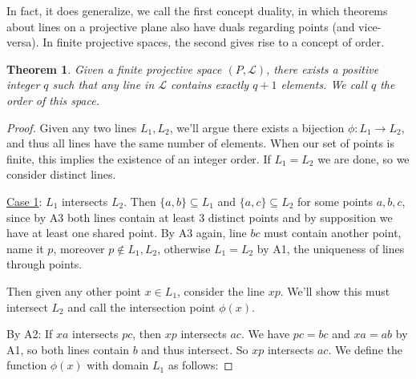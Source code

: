 \documentclass[12pt]{article}
\newtheorem{theorem}{Theorem}
\begin{document}
    In fact, it does generalize, we call the first concept duality,
    in which theorems about lines on a projective plane also have duals regarding points (and vice-versa).
    In finite projective spaces, the second gives rise to a concept of order\cite[p. 24]{beutelspacher_projective_1998}.

    \begin{theorem}
        Given a finite projective space $(P, \mathcal{L})$, there exists a positive integer $q$ such that any line in $\mathcal{L}$ contains exactly $q+1$ elements.
        We call $q$ the order of this space.
    \end{theorem}

    \begin{proof}
        Given any two lines $L_1, L_2$, we'll argue there exists a bijection $\phi: L_1 \rightarrow L_2$,
        and thus all lines have the same number of elements.
        When our set of points is finite, this implies the existence of an integer order.
        If $L_1 = L_2$ we are done, so we consider distinct lines.

        \underline{Case 1}: $L_1$ intersects $L_2$.
        Then $\{a, b\} \subseteq L_1$ and $\{a, c\} \subseteq L_2$ for some points $a,b,c$,
        since by A3 both lines contain at least 3 distinct points and by supposition we have at least one shared point.
        By A3 again, line $bc$ must contain another point, name it $p$, moreover $p \notin L_1, L_2$,
        otherwise $L_1 = L_2$ by A1, the uniqueness of lines through points.

        Then given any other point $x \in L_1$, consider the line $xp$.
        We'll show this must intersect $L_2$ and call the intersection point $\phi(x)$.

        \begin{figure}[h]
            \centering
            \label{fig:intersecting_lines}
        \end{figure}
        By A2: If $xa$ intersects $pc$, then $xp$ intersects $ac$.
        We have $pc=bc$ and $xa = ab$ by A1, so both lines contain $b$ and thus intersect.
        So $xp$ intersects $ac$.
        We define the function $\phi(x)$ with domain $L_1$ as follows:


\end{proof}
\end{document}
